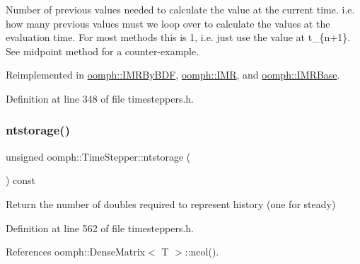Number of previous values needed to calculate the value at the current time. i.\+e. how many previous values must we loop over to calculate the values at the evaluation time. For most methods this is 1, i.\+e. just use the value at t\+\_\+\{n+1\}. See midpoint method for a counter-\/example. 



Reimplemented in \hyperlink{classoomph_1_1IMRByBDF_a4fb7f902b1a266b19cfdfe640d4c78d5}{oomph\+::\+I\+M\+R\+By\+B\+DF}, \hyperlink{classoomph_1_1IMR_a7cfe8ba542880aa524bcb837c1bc86e4}{oomph\+::\+I\+MR}, and \hyperlink{classoomph_1_1IMRBase_a93df756c834f8ba27956b8efb2af3636}{oomph\+::\+I\+M\+R\+Base}.



Definition at line 348 of file timesteppers.\+h.

\mbox{\label{classoomph_1_1TimeStepper_a3939b77ec3578e4bd5b453c85649d631}} 
\subsubsection{\texorpdfstring{ntstorage()}{ntstorage()}}
{\footnotesize\ttfamily unsigned oomph\+::\+Time\+Stepper\+::ntstorage (\begin{DoxyParamCaption}{ }\end{DoxyParamCaption}) const\hspace{0.3cm}{\ttfamily [inline]}}



Return the number of doubles required to represent history (one for steady) 



Definition at line 562 of file timesteppers.\+h.



References oomph\+::\+Dense\+Matrix$<$ T $>$\+::ncol().



